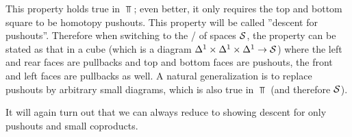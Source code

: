 This property holds true in $\Top$; even better, it only requires the top and bottom square to be homotopy pushouts.
This property will be called ''descent for pushouts''.
Therefore when switching to the \inftycat/ of spaces $\mathcal{S}$, the property can be stated as that in a cube (which is a diagram $\Delta^1\times\Delta^1\times\Delta^1\to\mathcal{S}$) where the left and rear faces are pullbacks and top and bottom faces are pushouts, the front and left faces are pullbacks as well.
A natural generalization is to replace pushouts by arbitrary small diagrams, which is also true in $\Top$ (and therefore $\mathcal{S}$).

It will again turn out that we can always reduce to showing descent for only pushouts and small coproducts.